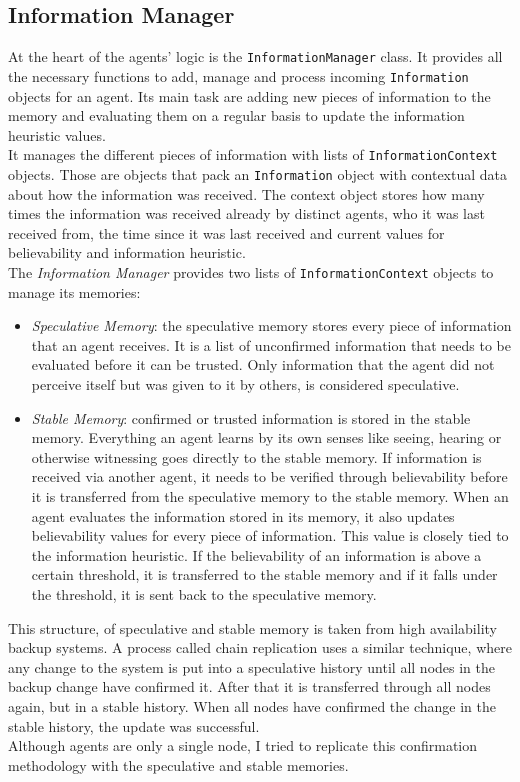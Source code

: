 \subsection{Information Manager}
At the heart of the agents' logic is the \verb|InformationManager| class. It provides all the necessary functions to add, manage and process incoming \verb|Information| objects for an agent. Its main task are adding new pieces of information to the memory and evaluating them on a regular basis to update the information heuristic values.\\
It manages the different pieces of information with lists of \verb|InformationContext| objects. Those are objects that pack an \verb|Information| object with contextual data about how the information was received. The context object stores how many times the information was received already by distinct agents, who it was last received from, the time since it was last received and current values for believability and information heuristic.\\
The \textit{Information Manager} provides two lists of \verb|InformationContext| objects to manage its memories:
\begin{itemize}
	\item \textit{Speculative Memory}: the speculative memory stores every piece of information that an agent receives. It is a list of unconfirmed information that needs to be evaluated before it can be trusted. Only information that the agent did not perceive itself but was given to it by others, is considered speculative.
	\item \textit{Stable Memory}: confirmed or trusted information is stored in the stable memory. Everything an agent learns by its own senses like seeing, hearing or otherwise witnessing goes directly to the stable memory. If information is received via another agent, it needs to be verified through believability before it is transferred from the speculative memory to the stable memory. When an agent evaluates the information stored in its memory, it also updates believability values for every piece of information. This value is closely tied to the information heuristic. If the believability of an information is above a certain threshold, it is transferred to the stable memory and if it falls under the threshold, it is sent back to the speculative memory.
\end{itemize}
This structure, of speculative and stable memory is taken from high availability backup systems. A process called chain replication uses a similar technique, where any change to the system is put into a speculative history until all nodes in the backup change have confirmed it. After that it is transferred through all nodes again, but in a stable history. When all nodes have confirmed the change in the stable history, the update was successful.~\cite{Van2004}\\
Although agents are only a single node, I tried to replicate this confirmation methodology with the speculative and stable memories.
